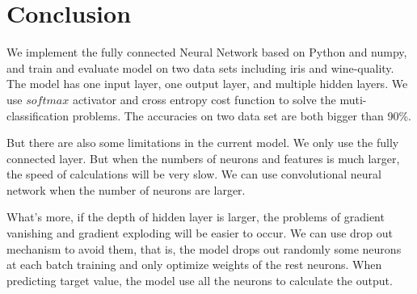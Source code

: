 \section{Conclusion}
We implement the fully connected Neural Network based on Python and numpy, and train and evaluate model on two data sets including iris and wine-quality. The model has one input layer, one output layer, and multiple hidden layers. We use \(softmax\) activator and cross entropy cost function to solve the muti-classification problems. The accuracies on two data set are both bigger than 90\%.

But there are also some limitations in the current model. We only use the fully connected layer. But when the numbers of neurons and features is much larger, the speed of calculations will be very slow. We can use convolutional neural network when the number of neurons are larger.

What's more, if the depth of hidden layer is larger, the problems of gradient vanishing and gradient exploding will be easier to occur. We can use drop out mechanism to avoid them, that is, the model drops out randomly some neurons at each batch training and only optimize weights of the rest neurons. When predicting target value, the model use all the neurons to calculate the output.

